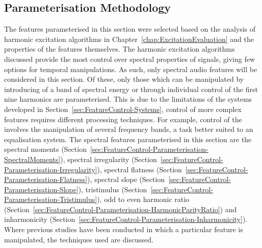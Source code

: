 	\subsection{Parameterisation Methodology}
	\label{sec:FeatureControl-Parameterisation-Methodology}
		The features parameterised in this section were selected based on the analysis of harmonic excitation
		algorithms in Chapter~\ref{chap:ExcitationEvaluation} and the properties of the features themselves. The
		harmonic excitation algorithms discussed provide the most control over spectral properties of signals,
		giving few options for temporal manipulations. As such, only spectral audio features will be considered in
		this section. Of these, only those which can be manipulated by introducing of a band of spectral energy or
		through individual control of the first nine harmonics are parameterised. This is due to the limitations of
		the systems developed in Section~\ref{sec:FeatureControl-Systems}, control of more complex features
		requires different processing techniques. For example, control of the  involves the
		manipulation of several frequency bands, a task better suited to an equalisation system. The spectral
		features parameterised in this section are the spectral moments
		(Section~\ref{sec:FeatureControl-Parameterisation-SpectralMoments}), spectral irregularity
		(Section~\ref{sec:FeatureControl-Parameterisation-Irregularity}), spectral flatness
		(Section~\ref{sec:FeatureControl-Parameterisation-Flatness}), spectral slope
		(Section~\ref{sec:FeatureControl-Parameterisation-Slope}), tristimulus
		(Section~\ref{sec:FeatureControl-Parameterisation-Tristimulus}), odd to even harmonic ratio
		(Section~\ref{sec:FeatureControl-Parameterisation-HarmonicParityRatio}) and inharmonicity
		(Section~\ref{sec:FeatureControl-Parameterisation-Inharmonicity}). Where previous studies have been
		conducted in which a particular feature is manipulated, the techniques used are discussed.

